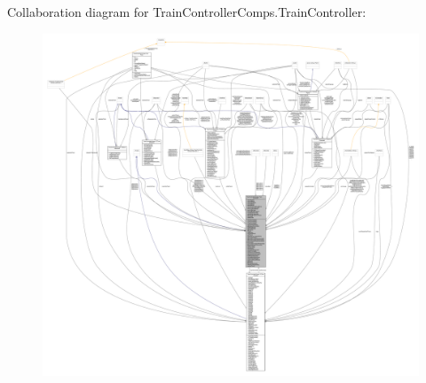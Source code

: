 Collaboration diagram for Train\+Controller\+Comps.\+Train\+Controller\+:
\nopagebreak
\begin{figure}[H]
\begin{center}
\leavevmode
\includegraphics[width=350pt]{classTrainControllerComps_1_1TrainController__coll__graph}
\end{center}
\end{figure}

